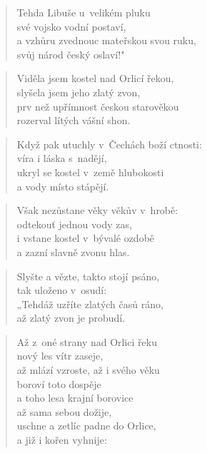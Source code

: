 \begin{verse}
Tehda Libuše u~velikém pluku \\
své vojsko vodní postaví, \\
a vzhůru zvednouc mateřskou svou ruku, \\
svůj národ český oslaví!"
\end{verse}

\begin{verse}
Viděla jsem kostel nad Orlicí řekou, \\
slyšela jsem jeho zlatý zvon, \\
prv než upřímnost českou starověkou \\
rozerval lítých vášní shon.
\end{verse}

\begin{verse}
Když pak utuchly v~Čechách boží ctnosti: \\
víra i láska s~nadějí, \\
ukryl se kostel v~země hlubokosti \\
a vody místo stápějí.
\end{verse}

\begin{verse}
Však nezůstane věky věkův v~hrobě: \\
odtekouť jednou vody zas, \\
i vstane kostel v~bývalé ozdobě \\
a zazní slavně zvonu hlas.
\end{verse}

\begin{verse}
Slyšte a vězte, takto stojí psáno, \\
tak uloženo v~osudí: \\
„Tehdáž uzříte zlatých časů ráno, \\
až zlatý zvon je probudí.
\end{verse}

\begin{verse}
Až z~oné strany nad Orlici řeku \\
nový les vítr zaseje, \\
až mlází vzroste, až i svého věku \\
boroví toto dospěje \\
a toho lesa krajní borovice \\
až sama sebou dožije, \\
uschne a zetlíc padne do Orlice, \\
a již i kořen vyhnije:
\end{verse}

